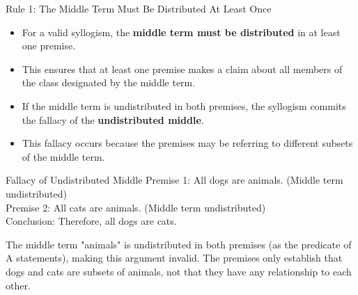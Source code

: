 \documentclass{beamer}
\begin{document}
	\begin{frame}{Rule 1: The Middle Term Must Be Distributed At Least Once}
		\begin{itemize}
			\item For a valid syllogism, the \textbf{middle term must be distributed} in at least one premise.
			\item This ensures that at least one premise makes a claim about all members of the class designated by the middle term.
			\item If the middle term is undistributed in both premises, the syllogism commits the fallacy of the \textbf{undistributed middle}.
			\item This fallacy occurs because the premises may be referring to different subsets of the middle term.
		\end{itemize}
		
		\begin{alertblock}{Fallacy of Undistributed Middle}
			\scriptsize
			Premise 1: All dogs are animals. (Middle term undistributed)\\
			Premise 2: All cats are animals. (Middle term undistributed)\\
			Conclusion: Therefore, all dogs are cats.
			
			The middle term "animals" is undistributed in both premises (as the predicate of A statements), making this argument invalid. The premises only establish that dogs and cats are subsets of animals, not that they have any relationship to each other.
		\end{alertblock}
	\end{frame}
	
\end{document}
